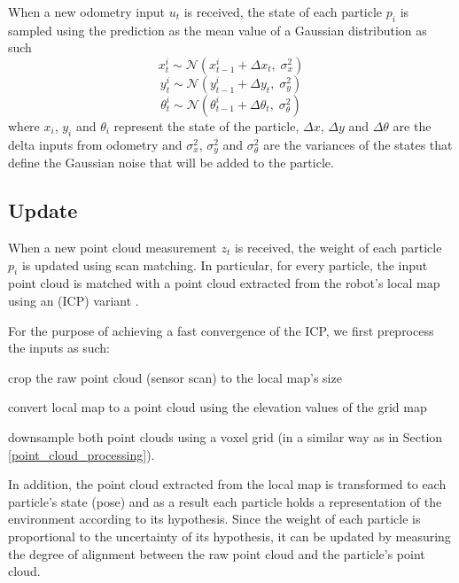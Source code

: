 When a new odometry input $u_t$ is received, the state of each particle
$p_i$ is sampled using the prediction as the mean value of a Gaussian
distribution as such
\begin{equation}
    x^i_t \sim \mathcal{N}(x^i_{t-1} + \Delta x_t ,\; \sigma^2_x)
\end{equation}
\begin{equation}
    y^i_t \sim \mathcal{N}(y^i_{t-1} + \Delta y_t ,\; \sigma^2_y)
\end{equation}
\begin{equation}
    \theta^i_t \sim
    \mathcal{N}(\theta^i_{t-1} + \Delta \theta_t ,\; \sigma^2_\theta)
\end{equation}
where
$x_i$, $y_i$ and $\theta_i$ represent the state of the particle,
$\Delta x$, $\Delta y$ and $\Delta \theta$ are the delta inputs from odometry
and $\sigma^2_x$, $\sigma^2_y$ and $\sigma^2_\theta$ are the variances of
the states that define the Gaussian noise that will be added to the particle.

\subsection{Update} \label{pf_update}

When a new point cloud measurement $z_t$ is received, the weight of each
particle $p_i$ is updated using scan matching.
In particular, for every particle, the input point cloud is matched with
a point cloud extracted from the robot's local map using
an  (ICP) variant \parencite{Zhang1994}.

For the purpose of achieving a fast convergence of the ICP,
we first preprocess the inputs as such:
\begin{enumerate*}[label=(\roman*)]
    \item crop the raw point cloud (sensor scan) to the local map's size
    \item convert local map to a point cloud using the elevation values of
        the grid map
    \item downsample both point clouds using a voxel grid (in a similar way
        as in Section \ref{point_cloud_processing}).
\end{enumerate*}

In addition, the point cloud extracted from the local map is transformed to
each particle's state (pose) and as a result each particle holds a
representation of the environment according to its hypothesis.
Since the weight of each particle is proportional to the uncertainty
of its hypothesis, it can be updated by measuring the degree of
alignment between the raw point cloud and the particle's point cloud.

